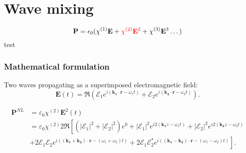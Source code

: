 \section{Wave mixing}

\[
\mathbf P = \epsilon_0 ( \chi^{\textup{(1)}} \mathbf E +
\textcolor{red}{\chi^{\textup{(2)}} \mathbf E^2} + \chi^{\textup{(3)}} \mathbf E^3 \dots )
\]
test


\begin{frame}
  \frametitle{Mathematical formulation}
Two waves propagating as a superimposed electromagnetic field: 
\[
     \mathbf{\mathbf{E}}(t) = \Re\left(\mathcal{E}_1e^{i(\mathbf{k_1} \cdot \mathbf{r} - \omega_1 t)}+\mathcal{E}_2e^{i(\mathbf{k_2} \cdot \mathbf{r} - \omega_2 t)} \right).
\]


\begin{align}
     \mathbf{P}^{NL} & = \varepsilon_0 \chi^{(2)} \mathbf{E}^2(t) \nonumber \\
&= \varepsilon_0 \chi^{(2)} 2 \Re \left[
\left(|\mathcal{E}_1|^2+|\mathcal{E}_2|^2\right)e^{0} + |\mathcal{E}_1|^2e^{i2(\mathbf{k_1} z - \omega_1t)}+|\mathcal{E}_2|^2e^{i2(\mathbf{k_2} z - \omega_2t)} \right.\nonumber \\
& \left.
+ 2\mathcal{E}_1 \mathcal{E}_2e^{i((\mathbf{k_1} + \mathbf{k_2}) \cdot \mathbf{r} - (\omega_1+\omega_2)t)} 
+ 2\mathcal{E}_1 \mathcal{E}_2^*e^{i((\mathbf{k_1} - \mathbf{k_2}) \cdot \mathbf{r} - (\omega_1-\omega_2)t)} 
\right] \label{eq:MixPNL}.
\end{align}

\end{frame}

